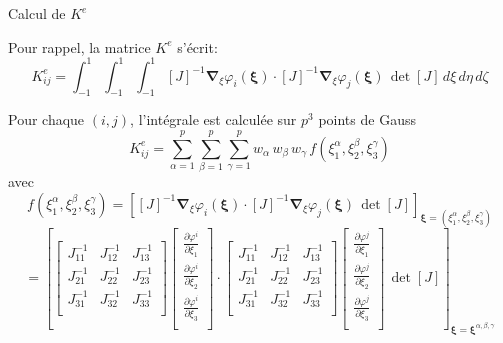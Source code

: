 \documentclass[
mode=present,    %
paper=a4paper,   %
orient=landscape,
display=slides,   %
size=10pt,     %
style=romain   %
]{powerdot}
\begin{document}
\begin{slide}[method=file]{Calcul de $K^e$}  %

Pour rappel, la matrice $K^e$ s'écrit:
\begin{equation*}
    K^e_{ij} = \int_{-1}^1\int_{-1}^1\int_{-1}^1 [J]^{-1} \boldsymbol{\nabla}_{\xi} \varphi_i(\boldsymbol{\xi})\cdot
    [J]^{-1} \boldsymbol{\nabla}_{\xi} \varphi_j(\boldsymbol{\xi})  \, \det [J] \, d\xi\,d\eta\,d\zeta
\end{equation*}

\bigskip
Pour chaque $(i,j)$, l'intégrale est calculée sur $p^3$ points de Gauss
\begin{equation*}
    K^e_{ij} = \sum_{\alpha=1}^p\sum_{\beta=1}^p\sum_{\gamma=1}^p
    w_{\alpha}\,w_{\beta}\,w_{\gamma}\, f(\xi_1^{\alpha},\xi_2^{\beta},\xi_3^{\gamma})
\end{equation*}
avec
\begin{equation*}
    f(\xi_1^{\alpha},\xi_2^{\beta},\xi_3^{\gamma}) =
    \left[
    [J]^{-1} \boldsymbol{\nabla}_{\xi} \varphi_i(\boldsymbol{\xi})\cdot
    [J]^{-1} \boldsymbol{\nabla}_{\xi} \varphi_j(\boldsymbol{\xi})  \, \det [J]
    \right]_{\boldsymbol{\xi}=(\xi_1^{\alpha},\xi_2^{\beta},\xi_3^{\gamma})}
\end{equation*}
\begin{equation*}
    =
    \left[
    \begin{bmatrix}
    J_{11}^{-1}  & J_{12}^{-1} & J_{13}^{-1}  \\
    J_{21}^{-1}  & J_{22}^{-1} & J_{23}^{-1}  \\
    J_{31}^{-1}  & J_{32}^{-1} & J_{33}^{-1}  \\
    \end{bmatrix}
    \begin{bmatrix}
    \frac{\partial\varphi^i}{\partial\xi_1}   \\
    \frac{\partial\varphi^i}{\partial\xi_2}   \\
    \frac{\partial\varphi^i}{\partial\xi_3}   \\
    \end{bmatrix}
    \cdot
    \begin{bmatrix}
    J_{11}^{-1}  & J_{12}^{-1} & J_{13}^{-1}  \\
    J_{21}^{-1}  & J_{22}^{-1} & J_{23}^{-1}  \\
    J_{31}^{-1}  & J_{32}^{-1} & J_{33}^{-1}  \\
    \end{bmatrix}
    \begin{bmatrix}
    \frac{\partial\varphi^j}{\partial\xi_1}   \\
    \frac{\partial\varphi^j}{\partial\xi_2}   \\
    \frac{\partial\varphi^j}{\partial\xi_3}   \\
    \end{bmatrix}
\, \det [J]
    \right]_{\boldsymbol{\xi}=\boldsymbol{\xi}^{\alpha,\beta,\gamma} }
\end{equation*}

\end{slide}
\end{document}
